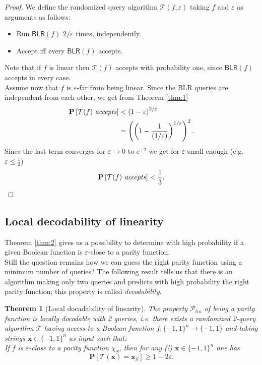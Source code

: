 \documentclass[a4paper]{article}
\newcommand{\prob}{\mathbf{P}}
\newcommand{\eps}{\varepsilon}
\newcommand{\boldx}{\boldsymbol{x}}
\theoremstyle{plain}
\newtheorem{theorem}{Theorem}
\theoremstyle{definition}
\theoremstyle{remark}
\begin{document}
\begin{proof}
  We define the randomized query algorithm \(\mathcal{T}(f,\eps)\)
  taking \(f\) and \(\eps\) as arguments as follows: 
  \begin{itemize}
  \item Run \(\textsf{BLR}(f)\) \(2/\eps\) times,
    independently.
  \item Accept iff every \(\textsf{BLR}(f)\) accepts. 
  \end{itemize}
  Note that if \(f\) is linear then \(\mathcal{T}(f)\) accepts with
  probability one, since \(\textsf{BLR}(f)\) accepts in every case.\\
  Assume now that \(f\) is \(\eps\)-far from being linear. Since the
  \textsf{BLR} queries are independent from each other, we get from
  Theorem \ref{thm:1}
  \begin{align}
    \prob\left[\mathcal{T}(f) \text{ \textit{accepts}}\right] 
    &< \left(1-\eps\right)^{2/\eps} \\
    &= \left(\left(1-\frac{1}{(1/\eps)}\right)^{1/\eps}\right)^2.
  \end{align}
  Since the last term converges for \(\eps \rightarrow 0\) to
  \(e^{-2}\) we get for \(\eps\) small enough (e.g. \(\eps \leq
  \frac{1}{2}\)) 
  \[\prob\left[\mathcal{T}(f) \text{ \textit{accepts}}\right] < \frac{1}{3}.\]
\end{proof}


\subsection{Local decodability of linearity}
\label{sec:local-decod-line}

Theorem \ref{thm:2} gives us a possibility to determine with high
probability if a given Boolean function is \(\eps\)-close to a parity
function. \\
Still the question remains how we can guess the right parity function
using a minimum number of queries? The following result tells us that
there is an algorithm making only two queries and predicts with high
probability the right parity function; this property is called
\emph{decodability}. 

\begin{theorem}[Local docadability of linearity] \label{thm:3}
  The property \(\mathcal{P}_{lin}\) of being a parity function is
  \emph{locally docodable} with 2 queries, i.e. there exists a
  randomized 2-query algorithm \(\mathcal{T}\) having access to a
  Boolean function \(f:\{-1,1\}^n \rightarrow \{-1,1\}\) and taking
  strings \(\boldx \in \{-1,1\}^n\) as input such that: \\
  If \(f\) is \(\eps\)-close to a  parity function \(\chi_S\), then
  for any (!) \(\boldx \in \{-1,1\}^n\) one has    
  \begin{equation}
    \label{eq:5}
    \prob\left[\mathcal{T}(\boldx) = \boldx_S\right] \geq 1 - 2\eps. 
  \end{equation}
\end{theorem}
\end{document}
